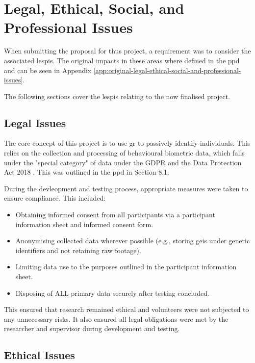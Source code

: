 \section{Legal, Ethical, Social, and Professional Issues}

When submitting the proposal for thus project, a requirement was to consider the associated \acp{lespi}.
The original impacts in these areas where defined in the \ac{ppd} and can be seen in Appendix \ref{app:original-legal-ethical-social-and-professional-issues}.

The following sections cover the \acp{lespi} relating to the now finalised project.

\subsection{Legal Issues}

The core concept of this project is to use \ac{gr} to passively identify individuals.
This relies on the collection and processing of behavioural biometric data, which falls under the "special category" of data under the GDPR and the Data Protection Act 2018 \parencite{gdprinfoGeneralDataProtection2024,legislation.gov.ukDataProtectionAct}. This was outlined in the \ac{ppd} in Section 8.1.

During the devleopment and testing process, appropriate measures were taken to ensure compliance. This included:

\begin{itemize}
    \item Obtaining informed consent from all participants via a participant information sheet and informed consent form.
    \item Anonymising collected data wherever possible (e.g., storing \acp{gei} under generic identifiers and not retaining raw footage).
    \item Limiting data use to the purposes outlined in the participant information sheet.
    \item Disposing of ALL primary data securely after testing concluded.
\end{itemize}

This ensured that research remained ethical and volunteers were not subjected to any unnecessary risks. 
It also ensured all legal obligations were met by the researcher and supervisor during development and testing.

\subsection{Ethical Issues}

